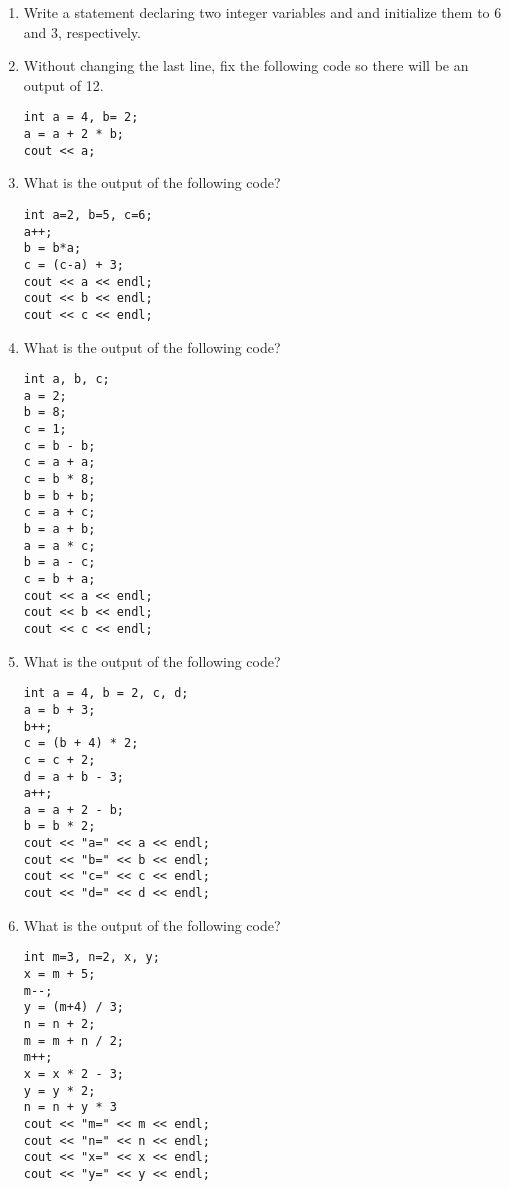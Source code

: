 \begin{enumerate}
\item Write a statement declaring two integer variables  and  and initialize them to 6 and 3, respectively. 
\item Without changing the last line, fix the following code so there will be an output of 12.

\noindent\begin{minipage}{\linewidth}\begin{lstlisting}
int a = 4, b= 2;
a = a + 2 * b;
cout << a;
\end{lstlisting}\end{minipage}

\item What is the output of the following code?

\noindent\begin{minipage}{\linewidth}\begin{lstlisting}
int a=2, b=5, c=6;
a++;
b = b*a;
c = (c-a) + 3;
cout << a << endl;
cout << b << endl;
cout << c << endl;
\end{lstlisting}\end{minipage}	
	
\item What is the output of the following code?

\noindent\begin{minipage}{\linewidth}\begin{lstlisting}
int a, b, c;
a = 2;
b = 8;
c = 1;
c = b - b;
c = a + a;
c = b * 8;
b = b + b;
c = a + c;
b = a + b;
a = a * c;
b = a - c;
c = b + a;
cout << a << endl;
cout << b << endl;
cout << c << endl;
\end{lstlisting}\end{minipage}

\item What is the output of the following code?

\noindent\begin{minipage}{\linewidth}\begin{lstlisting}
int a = 4, b = 2, c, d;
a = b + 3;
b++;
c = (b + 4) * 2;
c = c + 2;
d = a + b - 3;
a++;
a = a + 2 - b;
b = b * 2;
cout << "a=" << a << endl;  
cout << "b=" << b << endl;  
cout << "c=" << c << endl;  
cout << "d=" << d << endl; 
\end{lstlisting}\end{minipage}

\item What is the output of the following code?

\noindent\begin{minipage}{\linewidth}\begin{lstlisting}
int m=3, n=2, x, y;
x = m + 5;
m--;
y = (m+4) / 3;
n = n + 2;
m = m + n / 2;
m++;
x = x * 2 - 3;
y = y * 2;
n = n + y * 3
cout << "m=" << m << endl; 
cout << "n=" << n << endl;  
cout << "x=" << x << endl;   
cout << "y=" << y << endl; 
\end{lstlisting}\end{minipage}
\end{enumerate}

